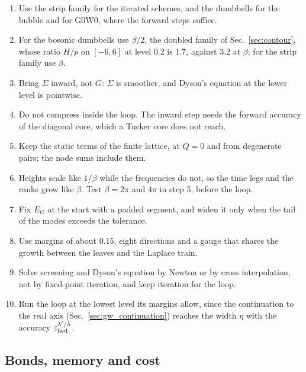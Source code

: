 \documentclass[aps,prb,reprint,a4paper]{revtex4-2}
\begin{document}
\begin{enumerate}
  \item Use the strip family for the iterated schemes, and the dumbbells for the bubble and for G0W0, where the forward steps suffice.
  \item For the bosonic dumbbells use $\beta/2$, the doubled family of Sec.~\ref{sec:contour}, whose ratio $H/p$ on $[-6,6]$ at level 0.2 is 1.7, against 3.2 at $\beta$; for the strip family use $\beta$.
  \item Bring $\Sigma$ inward, not $G$: $\Sigma$ is smoother, and Dyson's equation at the lower level is pointwise.
  \item Do not compress inside the loop. The inward step needs the forward accuracy of the diagonal core, which a Tucker core does not reach.
  \item Keep the static terms of the finite lattice, at $Q=0$ and from degenerate pairs; the node sums include them.
  \item Heights scale like $1/\beta$ while the frequencies do not, so the time legs and the ranks grow like $\beta$. Test $\beta=2\pi$ and $4\pi$ in step 5, before the loop.
  \item Fix $E_G$ at the start with a padded segment, and widen it only when the tail of the modes exceeds the tolerance.
  \item Use margins of about 0.15, eight directions and a gauge that shares the growth between the leaves and the Laplace train.
  \item Solve screening and Dyson's equation by Newton or by cross interpolation, not by fixed-point iteration, and keep iteration for the loop.
  \item Run the loop at the lowest level its margins allow, since the continuation to the real axis (Sec.~\ref{sec:gw_continuation}) reaches the width $\eta$ with the accuracy $\varepsilon_{\rm fwd}^{\lambda'/\lambda}$.
\end{enumerate}

\subsection{Bonds, memory and cost}
\label{sec:gw_cost}
\end{document}
